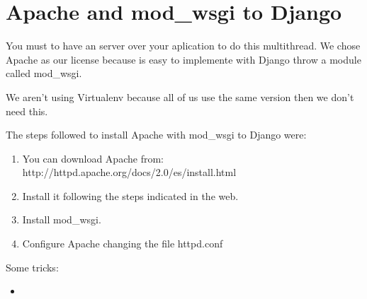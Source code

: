 \documentclass[a4paper, 12pt]{book}
\begin{document}
\section[Apache]{Apache and mod\_wsgi to Django}

You must to have an server over your aplication to do this multithread. We chose
Apache as our license because is easy to implemente with Django throw a module
called mod\_wsgi.

We aren't using Virtualenv because all of us use the same version then we don't
need this.

The steps followed to install Apache with mod\_wsgi to Django were:
\begin{enumerate}
   	\item You can download
   	Apache from: http://httpd.apache.org/docs/2.0/es/install.html
	\item Install it following the steps indicated in the web.
	\item Install mod\_wsgi.
	\item Configure Apache changing the file httpd.conf
\end{enumerate}

Some tricks:
\begin{itemize}
   	\item 
\end{itemize}


\backmatter
\end{document}
